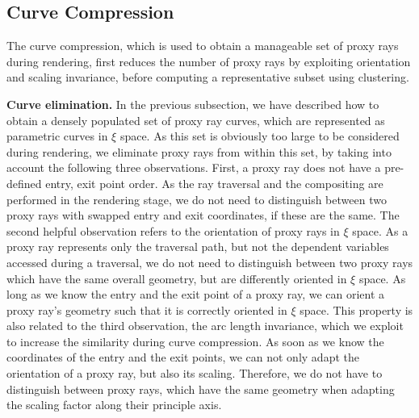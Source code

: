 \documentclass[review,journal]{vgtc}         %
\begin{document}
\subsection{Curve Compression}\label{subsec:curvecompression}

The curve compression, which is used to obtain a manageable set of proxy rays during rendering, first reduces the number of proxy rays by exploiting orientation and scaling invariance, before computing a representative subset using clustering.

\noindent \textbf{Curve elimination.} In the previous subsection, we have described how to obtain a densely populated set of proxy ray curves, which are represented as parametric curves in $\xi$ space. As this set is obviously too large to be considered during rendering, we eliminate proxy rays from within this set, by taking into account the following three observations. First, a proxy ray does not have a pre-defined entry, exit point order. As the ray traversal and the compositing are performed in the rendering stage, we do not need to distinguish between two proxy rays with swapped entry and exit coordinates, if these are the same. The second helpful observation refers to the orientation of proxy rays in $\xi$ space. As a proxy ray represents only the traversal path, but not the dependent variables accessed during a traversal, we do not need to distinguish between two proxy rays which have the same overall geometry, but are differently oriented in $\xi$ space. As long as we know the entry and the exit point of a proxy ray, we can orient a proxy ray's geometry such that it is correctly oriented in $\xi$ space. This property is also related to the third observation, the arc length invariance, which we exploit to increase the similarity during curve compression. As soon as we know the coordinates of the entry and the exit points, we can not only adapt the orientation of a proxy ray, but also its scaling. Therefore, we do not have to distinguish between proxy rays, which have the same geometry when adapting the scaling factor along their principle axis.
\end{document}
